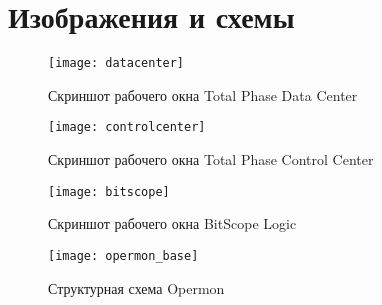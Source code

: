 \section{Изображения и схемы}
\label{app:figures}

\begin{figure}[H]
 \centering
 \texttt{[image: datacenter]}
 \caption{Скриншот рабочего окна Total Phase Data Center}
 \label{fig:datacenter}
\end{figure}

\begin{figure}[H]
 \centering
 \texttt{[image: controlcenter]}
 \caption{Скриншот рабочего окна Total Phase Control Center}
 \label{fig:controlcenter}
\end{figure}

\begin{figure}[H]
 \centering
 \texttt{[image: bitscope]}
 \caption{Скриншот рабочего окна BitScope Logic}
 \label{fig:bitscopelogic}
\end{figure}

\begin{figure}[H]
 \centering
 \texttt{[image: opermon\_base]}
 \caption{Структурная схема Opermon}
 \label{fig:opermon_base}
\end{figure}